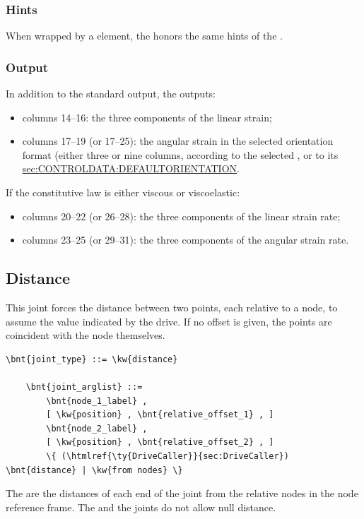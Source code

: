 \subsubsection{Hints}
When wrapped by a  element, the 
honors the same hints of the .

\subsubsection{Output}
In addition to the standard output, the 
outputs:
\begin{itemize}
\item columns 14--16: the three components of the linear strain;
\item columns 17--19 (or 17--25): the angular strain
in the selected orientation format (either three or nine columns,
according to the selected , or to its 
\hyperref{default value)}{default value, see Section~}{)}{sec:CONTROLDATA:DEFAULTORIENTATION}.
\end{itemize}
If the constitutive law is either viscous or viscoelastic:
\begin{itemize}
\item columns 20--22 (or 26--28): the three components
of the linear strain rate;
\item columns 23--25 (or 29--31): the three components
of the angular strain rate.
\end{itemize}




\subsection{Distance}
This joint forces the distance between two points,
each relative to a node, to assume the value indicated by the drive.
If no offset is given, the points are coincident with the node themselves.
\begin{Verbatim}[commandchars=\\\{\}]
    \bnt{joint_type} ::= \kw{distance}

    \bnt{joint_arglist} ::=
        \bnt{node_1_label} , 
        [ \kw{position} , \bnt{relative_offset_1} , ]
        \bnt{node_2_label} ,
        [ \kw{position} , \bnt{relative_offset_2} , ]
        \{ (\htmlref{\ty{DriveCaller}}{sec:DriveCaller}) \bnt{distance} | \kw{from nodes} \}
\end{Verbatim}
The  are the distances of each end
of the joint from the relative nodes in the node reference frame.
The  and the  joints
do not allow null distance.


